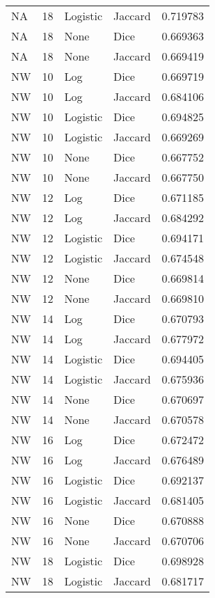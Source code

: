 \documentclass{article}
\begin{document}
\begin{center}
\begin{supertabular}{| l | l | l | l | l |}
            NA & 18 & Logistic & Jaccard & 0.719783 \\
            NA & 18 & None & Dice & 0.669363 \\
            NA & 18 & None & Jaccard & 0.669419 \\
            NW & 10 & Log & Dice & 0.669719 \\
            NW & 10 & Log & Jaccard & 0.684106 \\
            NW & 10 & Logistic & Dice & 0.694825 \\
            NW & 10 & Logistic & Jaccard & 0.669269 \\
            NW & 10 & None & Dice & 0.667752 \\
            NW & 10 & None & Jaccard & 0.667750 \\
            NW & 12 & Log & Dice & 0.671185 \\
            NW & 12 & Log & Jaccard & 0.684292 \\
            NW & 12 & Logistic & Dice & 0.694171 \\
            NW & 12 & Logistic & Jaccard & 0.674548 \\
            NW & 12 & None & Dice & 0.669814 \\
            NW & 12 & None & Jaccard & 0.669810 \\
            NW & 14 & Log & Dice & 0.670793 \\
            NW & 14 & Log & Jaccard & 0.677972 \\
            NW & 14 & Logistic & Dice & 0.694405 \\
            NW & 14 & Logistic & Jaccard & 0.675936 \\
            NW & 14 & None & Dice & 0.670697 \\
            NW & 14 & None & Jaccard & 0.670578 \\
            NW & 16 & Log & Dice & 0.672472 \\
            NW & 16 & Log & Jaccard & 0.676489 \\
            NW & 16 & Logistic & Dice & 0.692137 \\
            NW & 16 & Logistic & Jaccard & 0.681405 \\
            NW & 16 & None & Dice & 0.670888 \\
            NW & 16 & None & Jaccard & 0.670706 \\
            NW & 18 & Logistic & Dice & 0.698928 \\
            NW & 18 & Logistic & Jaccard & 0.681717 \\

\end{supertabular}
\end{center}
\end{document}

